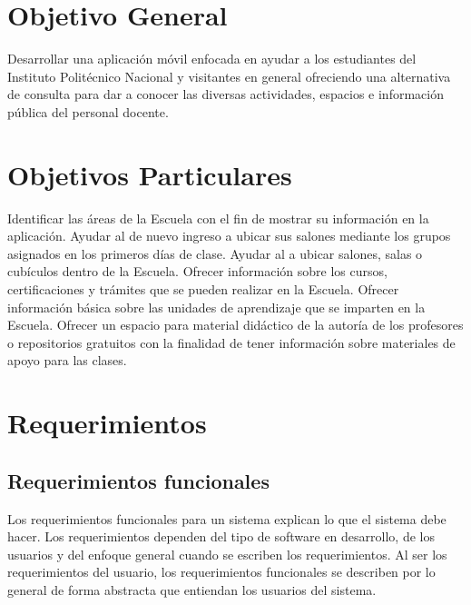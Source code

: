 \section{Objetivo General}

	Desarrollar una aplicación móvil enfocada en ayudar a los estudiantes del Instituto Politécnico Nacional y visitantes en general ofreciendo una alternativa de consulta para dar a conocer las diversas actividades, espacios e información pública del personal docente.
	
	\section{Objetivos Particulares}	
	
	
	
	\begin{UClist}
		\UCli Identificar las áreas de la Escuela con el fin de mostrar su información en la aplicación.
		\UCli Ayudar al  de nuevo ingreso a ubicar sus salones mediante los grupos asignados en los primeros días de clase.
		\UCli Ayudar al  a ubicar salones, salas o cubículos dentro de la Escuela.
		\UCli Ofrecer información sobre los cursos, certificaciones y trámites que se pueden realizar en la Escuela.
		\UCli Ofrecer información básica sobre las unidades de aprendizaje que se imparten en la Escuela.
		\UCli Ofrecer un espacio para material didáctico de la autoría de los profesores o repositorios gratuitos con la finalidad de tener información sobre materiales de apoyo para las clases.
	\end{UClist}
	
	\section{Requerimientos}
	\subsection{Requerimientos funcionales}
	
	Los requerimientos funcionales para un sistema explican lo que el sistema debe hacer. Los requerimientos dependen del tipo de software en desarrollo, de los usuarios y del enfoque general cuando se escriben los requerimientos. Al ser los requerimientos del usuario, los requerimientos funcionales se describen por lo general de forma abstracta que entiendan los usuarios del sistema. \cite{15}
	
